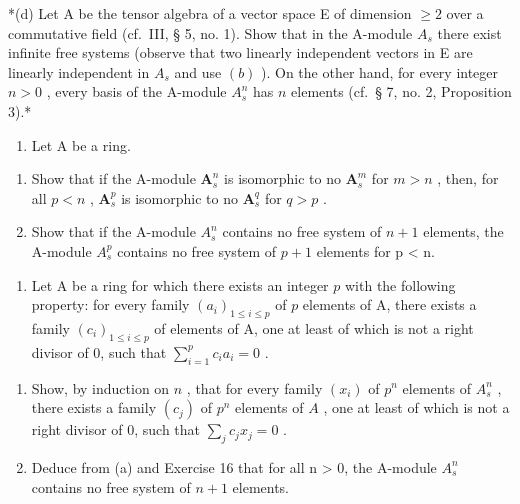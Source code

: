 *(d) Let A be the tensor algebra of a vector space E of dimension \(\geqslant 2\) over a commutative field (cf.~III, § 5, no. 1). Show that in the A-module \(A_s\) there exist infinite free systems (observe that two linearly independent vectors in E are linearly independent in \(A_s\) and use \((b)\) ). On the other hand, for every integer \(n > 0\) , every basis of the A-module \(A_s^n\) has \(n\) elements (cf.~§ 7, no. 2, Proposition 3).*

\begin{enumerate}
\def\labelenumi{\arabic{enumi}.}
\setcounter{enumi}{16}
\tightlist
\item
  Let A be a ring.
\end{enumerate}

\begin{enumerate}
\def\labelenumi{(\alph{enumi})}
\item
  Show that if the A-module \(\mathbf{A}_s^n\) is isomorphic to no \(\mathbf{A}_s^m\) for \(m > n\) , then, for all \(p < n\) , \(\mathbf{A}_s^p\) is isomorphic to no \(\mathbf{A}_s^q\) for \(q > p\) .
\item
  Show that if the A-module \(A_{s}^{n}\) contains no free system of \(n + 1\) elements, the A-module \(A_{s}^{p}\) contains no free system of \(p + 1\) elements for p \textless{} n.
\end{enumerate}

\begin{enumerate}
\def\labelenumi{\arabic{enumi}.}
\setcounter{enumi}{17}
\tightlist
\item
  Let A be a ring for which there exists an integer \(p\) with the following property: for every family \((a_i)_{1 \leqslant i \leqslant p}\) of \(p\) elements of A, there exists a family \((c_i)_{1 \leqslant i \leqslant p}\) of elements of A, one at least of which is not a right divisor of 0, such that \(\sum_{i=1}^{p} c_i a_i = 0\) .
\end{enumerate}

\begin{enumerate}
\def\labelenumi{(\alph{enumi})}
\item
  Show, by induction on \(n\) , that for every family \((x_{i})\) of \(p^n\) elements of \(A_s^n\) , there exists a family \((c_j)\) of \(p^n\) elements of \(A\) , one at least of which is not a right divisor of 0, such that \(\sum_{j} c_j x_j = 0\) .
\item
  Deduce from (a) and Exercise 16 that for all n \textgreater{} 0, the A-module \(A_{s}^{n}\) contains no free system of \(n + 1\) elements.
\end{enumerate}

